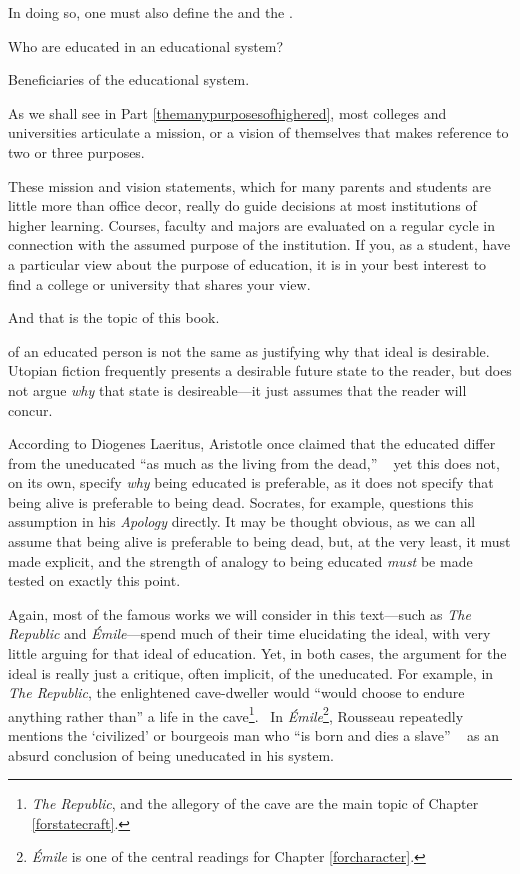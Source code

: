 In doing so, one must also define the  and the . 
\begin{entities}\label{entities:entitieseducated}Who are educated in an educational system?\end{entities}

\begin{objects} \label{objects:beneficiaries}Beneficiaries of the educational system.\end{objects}
 As we shall see in Part \ref{themanypurposesofhighered}, most colleges and universities articulate a mission, or a vision of themselves that makes reference to two or three purposes.

These mission and vision statements, which for many parents and students are little more than office decor, really do guide decisions at most institutions of higher learning. Courses, faculty and majors are evaluated on a regular cycle in connection with the assumed purpose of the institution. If you, as a student, have a particular view about the purpose of education, it is in your best interest to find a college or university that shares your view.

And that is the topic of this book.

 of an educated person is not the same as justifying why that ideal is desirable. Utopian fiction frequently presents a desirable future state to the reader, but does not argue \emph{why} that state is desireable---it just assumes that the reader will concur.

According to Diogenes Laeritus, Aristotle once claimed that the educated differ from the uneducated ``as much as the living from the dead,'' ~\citep[p. 463]{Laertius:eqeg5o3J} yet this does not, on its own, specify \emph{why} being educated is preferable, as it does not specify that being alive is preferable to being dead. Socrates, for example, questions this assumption in his \emph{Apology} directly. It may be thought obvious, as we can all assume that being alive is preferable to being dead, but, at the very least, it must made explicit, and the strength of analogy to being educated \emph{must} be made tested on exactly this point.

Again, most of the famous works we will consider in this text---such as \emph{The Republic} and \emph{Émile}---spend much of their time elucidating the ideal, with very little arguing for that ideal of education. Yet, in both cases, the argument for the ideal is really just a critique, often implicit, of the uneducated. For example, in \emph{The Republic}, the enlightened cave-dweller would ``would choose to endure anything rather than'' a life in the cave\footnote{\emph{The Republic}, and the allegory of the cave are the main topic of Chapter \ref{forstatecraft}.}.~\citep[516e]{Plato:1994ug} In \emph{Émile}\footnote{\emph{É⁠mile} is one of the central readings for Chapter \ref{forcharacter}.}, Rousseau repeatedly mentions the `civilized' or bourgeois man who ``is born and dies a slave'' ~\citep[p. 16]{Rousseau:2007vp} as an absurd conclusion of being uneducated in his system.

